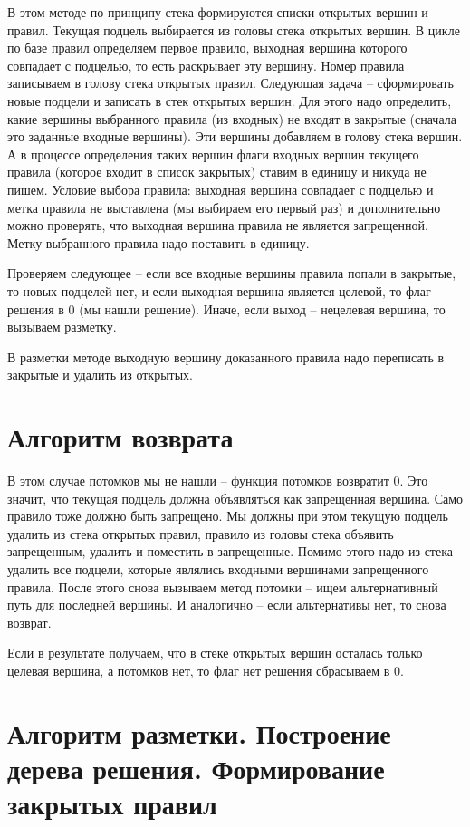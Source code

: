 В этом методе по принципу стека формируются списки открытых вершин и правил. Текущая подцель выбирается из головы стека открытых вершин. В цикле по базе правил определяем первое правило, выходная вершина которого совпадает с подцелью, то есть раскрывает эту вершину. Номер правила записываем в голову стека открытых правил. Следующая задача -- сформировать новые подцели и записать в стек открытых вершин. Для этого надо определить, какие вершины выбранного правила (из входных) не входят в закрытые (сначала это заданные входные вершины). Эти вершины добавляем в голову стека вершин. А в процессе определения таких вершин флаги входных вершин текущего правила (которое входит в список закрытых) ставим в единицу и никуда не пишем. Условие выбора правила: выходная вершина совпадает с подцелью и метка правила не выставлена (мы выбираем его первый раз) и дополнительно можно проверять, что выходная вершина правила не является запрещенной. Метку выбранного правила надо поставить в единицу.

Проверяем следующее -- если все входные вершины правила попали в закрытые, то новых подцелей нет, и если выходная вершина является целевой, то флаг решения в 0 (мы нашли решение). Иначе, если выход -- нецелевая вершина, то вызываем разметку.

В разметки методе выходную вершину доказанного правила надо переписать в закрытые и удалить из открытых.

\section{Алгоритм возврата}

В этом случае потомков мы не нашли -- функция потомков возвратит 0. Это значит, что текущая подцель должна объявляться как запрещенная вершина. Само правило тоже должно быть запрещено. Мы должны при этом текущую подцель удалить из стека открытых правил, правило из головы стека объявить запрещенным, удалить и поместить в запрещенные. Помимо этого надо из стека удалить все подцели, которые являлись входными вершинами запрещенного правила. После этого снова вызываем метод потомки -- ищем альтернативный путь для последней вершины. И аналогично -- если альтернативы нет, то снова возврат.

Если в результате получаем, что в стеке открытых вершин осталась только целевая вершина, а потомков нет, то флаг нет решения сбрасываем в 0.

\section{Алгоритм разметки. Построение дерева решения. Формирование закрытых правил}

